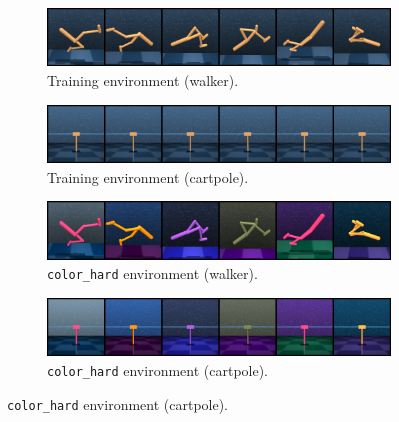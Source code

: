 \begin{figure}
    \centering
    \begin{subfigure}[b]{0.48\textwidth}
        \centering
        \includegraphics[width=\textwidth]{figures/visualizations/obs_env.png}
        \caption{Training environment (walker).}
        \vspace{0.1in}
    \end{subfigure}
    \begin{subfigure}[b]{0.48\textwidth}
        \centering
        \includegraphics[width=\textwidth]{figures/visualizations/obs_cartpole_env.png}
        \caption{Training environment (cartpole).}
        \vspace{0.1in}
    \end{subfigure}
    \begin{subfigure}[b]{0.48\textwidth}
        \centering
        \includegraphics[width=\textwidth]{figures/visualizations/obs_env_color_hard.png}
        \caption{\texttt{color\_hard} environment (walker).}
        \vspace{0.1in}
    \end{subfigure}
    \begin{subfigure}[b]{0.48\textwidth}
        \centering
        \includegraphics[width=\textwidth]{figures/visualizations/obs_cartpole_env_color_hard.png}
        \caption{\texttt{color\_hard} environment (cartpole).}
        \vspace{0.1in}
    \end{subfigure}

\end{figure}
